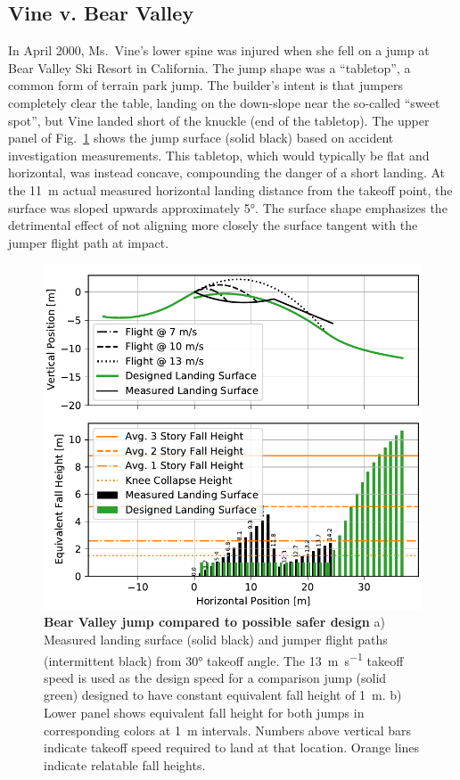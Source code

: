 \documentclass{article}
\begin{document}
\subsection{Vine v. Bear Valley}
%
In April 2000, Ms.~Vine's lower spine was injured when she fell on a jump at
Bear Valley Ski Resort in California. The jump shape was a ``tabletop'', a
common form of terrain park jump.  The builder's intent is that jumpers
completely clear the table, landing on the down-slope near the so-called
``sweet spot'', but Vine landed short of the knuckle (end of the tabletop). The
upper panel of Fig.~\ref{fig:vine-v-bear-valley} shows the jump surface (solid
black) based on  accident investigation measurements. This tabletop, which
would typically be flat and horizontal, was instead concave, compounding the
danger of a short landing.  At the 11~\si{\meter} actual measured horizontal
landing distance from the takeoff point, the surface was sloped upwards
approximately 5\si{\degree}.  The surface shape emphasizes the detrimental
effect of not aligning more closely the surface tangent with the jumper flight
path at impact.
%
\begin{figure}
  \centering
  \includegraphics[width=5.25in]{figures/vine-v-bear-valley.pdf}
  \caption{\textbf{Bear Valley jump compared to possible safer design}
  a) Measured landing surface (solid black) and jumper flight paths (intermittent
  black) from 30\si{\degree} takeoff angle. The
  13~\si{\meter\per\second} takeoff speed is used as the design speed for a comparison 
  jump (solid green) designed to have constant equivalent fall height of 1~\si{\meter}. 
  b) Lower panel shows equivalent fall height for both jumps
  in corresponding colors at 1~\si{\meter} intervals. Numbers above 
  vertical bars indicate takeoff speed required
  to land at that location. Orange lines indicate relatable fall heights.}
  \label{fig:vine-v-bear-valley}
\end{figure}
\end{document}
